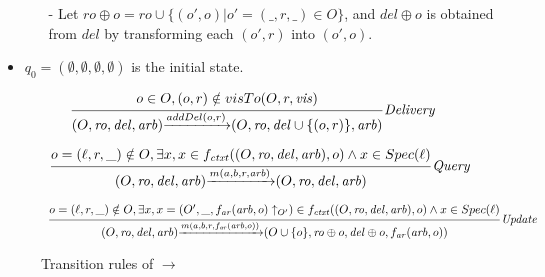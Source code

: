 \begin{itemize}
\begin {itemize}
        \begin{itemize}
        \setlength{\itemsep}{0.5pt}
        \item[-] $O' = O \cup \{ o \}$. 
    
        \item[-] $\mathit{vis'} = \mathit{vis} \cup \{ (o',o) \vert (o',r) \in \mathit{vis} \}$. 
    
        \item[-] If $o$ is an update operation, then $\mathit{arb}'$ is obtained from $\mathit{arb}$ by possibly adding relations between $O$ and $\{ o \}$; Else, $\mathit{arb}' = \mathit{arb}$.
        \end{itemize} 

     \item[-] Let $ro \oplus o = ro \cup \{ (o',o) \vert o' = (\_,r,\_) \in O \}$, and $del \oplus o$ is obtained from $del$ by transforming each $(o',r)$ into $(o',o)$. 
    \end{itemize} 

\item[-] $q_0=(\emptyset,\emptyset,\emptyset,\emptyset)$ is the initial state.
\end{itemize} 

\begin{figure}[ht]

\[
\begin{array}{l c}
\bigfrac{ o \in O, (o,r)\notin visTo(O,r,\mathit{vis}) } 
{ (O,\mathit{ro},\mathit{del},\mathit{arb}) {\xrightarrow{addDel(o,r)}} (O,\mathit{ro},\mathit{del} \cup \{ (o,r) \},\mathit{arb}) } {\mathit{Delivery}}
\end{array}
\]


\[
\begin{array}{l c}
\bigfrac{ o=(\ell,r,\_) \notin O, \exists x, x \in f_{\mathit{ctxt}}((O,\mathit{ro},\mathit{del},\mathit{arb}),o) \wedge x \in Spec(\ell) } 
{ (O,\mathit{ro},\mathit{del},\mathit{arb}) {\xrightarrow{m(a,b,r,\mathit{arb})}} (O,\mathit{ro},\mathit{del},\mathit{arb}) } {\mathit{Query}}
\end{array}
\]


\[
\begin{array}{l c}
\bigfrac{ o = (\ell,r,\_) \notin O, \exists x, x = (O',\_,f_{\mathit{ar}}(\mathit{arb},o) \uparrow_{O'} ) \in f_{\mathit{ctxt}}((O,\mathit{ro},\mathit{del},\mathit{arb}),o) \wedge x \in Spec(\ell) } 
{ (O,\mathit{ro},\mathit{del},\mathit{arb}) {\xrightarrow{m(a,b,r,f_{\mathit{ar}}(\mathit{arb},o))}} (O \cup \{ o \},\mathit{ro} \oplus o ,\mathit{del} \oplus o,f_{\mathit{ar}}(\mathit{arb},o)) } {\mathit{Update}} 
\end{array}
\] 

\caption{Transition rules of $\rightarrow$}
\label{fig:transition rules of RImpSpec}
\end{figure}

